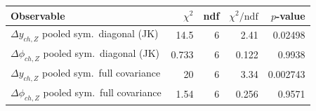 \begin{tabular}{|l|r|r|r|r|}
\hline
Observable & $\chi^2$ & ndf & $\chi^2/\mathrm{ndf}$ & $p$-value \\
\hline
$\Delta y_{ch,Z}$ pooled sym.\ diagonal (JK) & 14.5 & 6 & 2.41 & 0.02498 \\
$\Delta\phi_{ch,Z}$ pooled sym.\ diagonal (JK) & 0.733 & 6 & 0.122 & 0.9938 \\
$\Delta y_{ch,Z}$ pooled sym.\ full covariance & 20 & 6 & 3.34 & 0.002743 \\
$\Delta\phi_{ch,Z}$ pooled sym.\ full covariance & 1.54 & 6 & 0.256 & 0.9571 \\
\hline
\end{tabular}
